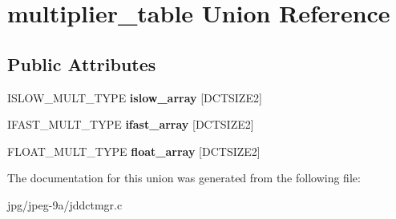 \hypertarget{unionmultiplier__table}{\section{multiplier\+\_\+table Union Reference}
\label{unionmultiplier__table}
}
\subsection*{Public Attributes}
\begin{DoxyCompactItemize}
\item 
\hypertarget{unionmultiplier__table_a8585c9759405a74e7cbd4d6b3f8da073}{I\+S\+L\+O\+W\+\_\+\+M\+U\+L\+T\+\_\+\+T\+Y\+P\+E {\bfseries islow\+\_\+array} \mbox{[}D\+C\+T\+S\+I\+Z\+E2\mbox{]}}\label{unionmultiplier__table_a8585c9759405a74e7cbd4d6b3f8da073}

\item 
\hypertarget{unionmultiplier__table_a815932c92e5d7cea970c6cddb5bbf6f1}{I\+F\+A\+S\+T\+\_\+\+M\+U\+L\+T\+\_\+\+T\+Y\+P\+E {\bfseries ifast\+\_\+array} \mbox{[}D\+C\+T\+S\+I\+Z\+E2\mbox{]}}\label{unionmultiplier__table_a815932c92e5d7cea970c6cddb5bbf6f1}

\item 
\hypertarget{unionmultiplier__table_a3867da0f271dbfd782ad1e1603e71e88}{F\+L\+O\+A\+T\+\_\+\+M\+U\+L\+T\+\_\+\+T\+Y\+P\+E {\bfseries float\+\_\+array} \mbox{[}D\+C\+T\+S\+I\+Z\+E2\mbox{]}}\label{unionmultiplier__table_a3867da0f271dbfd782ad1e1603e71e88}

\end{DoxyCompactItemize}


The documentation for this union was generated from the following file\+:\begin{DoxyCompactItemize}
\item 
jpg/jpeg-\/9a/jddctmgr.\+c\end{DoxyCompactItemize}
